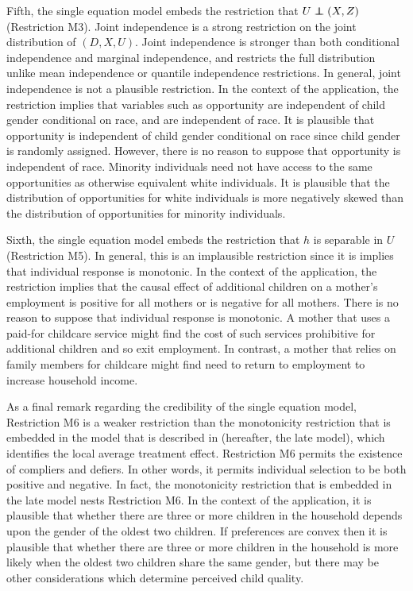 \documentclass[10pt,a4paper,twoside]{article}
\newcommand\independent{\protect\mathpalette{\protect\independenT}{\perp}}
\def\independenT#1#2{\mathrel{\rlap{$#1#2$}\mkern2mu{#1#2}}}
\numberwithin{equation}{section}
\begin{document}
Fifth, the single equation model embeds the restriction that $U\independent (X,Z)$ (Restriction M3). Joint independence is a strong restriction on the joint distribution of $(D,X,U)$. Joint independence is stronger than both conditional independence and marginal independence, and restricts the full distribution unlike mean independence or quantile independence restrictions. In general, joint independence is not a plausible restriction. In the context of the application, the restriction implies that variables such as opportunity are independent of child gender conditional on race, and are independent of race. It is plausible that opportunity is independent of child gender conditional on race since child gender is randomly assigned. However, there is no reason to suppose that opportunity is independent of race. Minority individuals need not have access to the same opportunities as otherwise equivalent white individuals. It is plausible that the distribution of opportunities for white individuals is more negatively skewed than the distribution of opportunities for minority individuals.  

Sixth, the single equation model embeds the restriction that $h$ is separable in $U$ (Restriction M5). In general, this is an implausible restriction since it is implies that individual response is monotonic. In the context of the application, the restriction implies that the causal effect of additional children on a mother's employment is positive for all mothers or is negative for all mothers. There is no reason to suppose that individual response is monotonic. A mother that uses a paid-for childcare service might find the cost of such services prohibitive for additional children and so exit employment. In contrast, a mother that relies on family members for childcare might find need to return to employment to increase household income.

As a final remark regarding the credibility of the single equation model, Restriction M6 is a weaker restriction than the monotonicity restriction that is embedded in the model that is described in \cite{ai94} (hereafter, the late model), which identifies the local average treatment effect. Restriction M6 permits the existence of compliers and defiers. In other words, it permits individual selection to be both positive and negative. In fact, the monotonicity restriction that is embedded in the late model nests Restriction M6. In the context of the application, it is plausible that whether there are three or more children in the household depends upon the gender of the oldest two children. If preferences are convex then it is plausible that whether there are three or more children in the household is more likely when the oldest two children share the same gender, but there may be other considerations which determine perceived child quality. 
\end{document}
